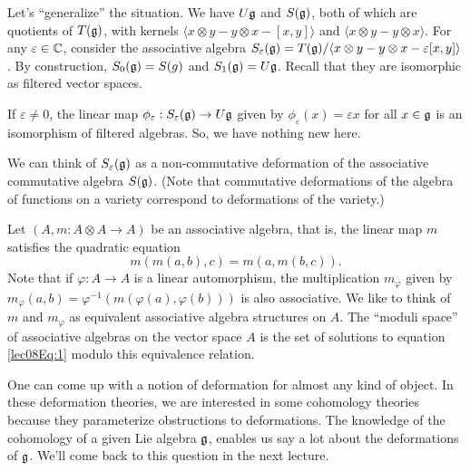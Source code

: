  Let's ``generalize'' the situation. We have $U\mathfrak{g}$ and $S(\mathfrak{g})$, both of which are
 quotients of $T(\mathfrak{g})$, with kernels $\langle x\otimes y-y\otimes x -[x,y]\rangle$ and
 $\langle x\otimes y-y\otimes x\rangle$. For any $\varepsilon \in \mathbb{C}$, consider the
 associative algebra $S_\varepsilon(\mathfrak{g}) = T(\mathfrak{g})/\langle x\otimes y-y\otimes x
 -\varepsilon[x,y]\rangle$. By construction, $S_0(\mathfrak{g})=S(g)$ and $S_1(\mathfrak{g})=U\mathfrak{g}$. Recall
 that they are isomorphic as filtered vector spaces.
 \begin{remark}
   If $\varepsilon\neq 0$, the linear map $\phi_\varepsilon: S_\varepsilon(\mathfrak{g}) \to
   U\mathfrak{g}$ given by $\phi_\varepsilon(x)=\varepsilon x$ for all $x\in \mathfrak{g}$ is an
   isomorphism of filtered algebras. So, we have nothing new here.
 \end{remark}
 We can think of $S_\varepsilon (\mathfrak{g})$ as a non-commutative deformation of the
 associative commutative algebra $S(\mathfrak{g})$. (Note that commutative deformations of the
 algebra of functions on a variety correspond to deformations of the variety.)

 Let $(A,m:A\otimes A\to A)$ be an associative algebra, that is, the linear map $m$
 satisfies the quadratic equation
 \begin{equation}\label{lec08Eq:1}
 m(m(a,b),c)=m(a,m(b,c)). %
 \end{equation}
 Note that if $\varphi:A\to A$ is a linear automorphism, the multiplication
 $m_\varphi$ given by $m_\varphi(a,b)=\varphi^{-1}(m(\varphi(a),\varphi(b)))$ is also
 associative. We like to think of $m$ and $m_\varphi$ as equivalent associative
 algebra structures on $A$. The ``moduli space'' of associative algebras on the vector
 space $A$ is the set of solutions to equation \ref{lec08Eq:1} modulo this equivalence
 relation.

 One can come up with a notion of deformation for almost any kind of object. In these
 deformation theories, we are interested in some cohomology theories because they
 parameterize obstructions to deformations. The knowledge of the cohomology of a
 given Lie algebra $\mathfrak{g}$, enables us say a lot about the deformations of $\mathfrak{g}$. We'll
 come back to this question in the next lecture.

